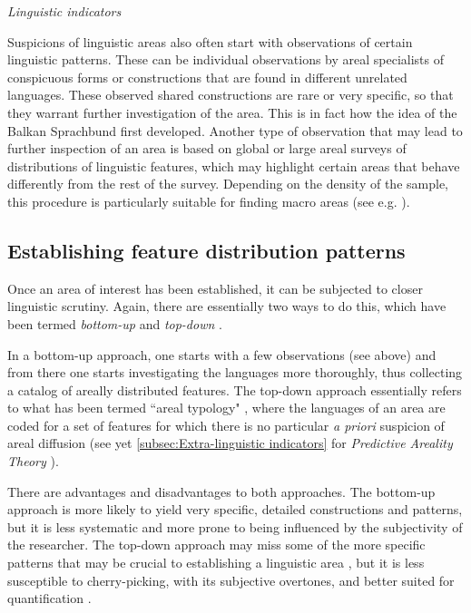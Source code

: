 \documentclass[output=paper,
modfonts
]{langscibook}
\begin{document}
\noindent \textit{Linguistic indicators}

\noindent Suspicions of linguistic areas also often start with observations of certain linguistic patterns. These can be individual observations by areal specialists of conspicuous forms or constructions that are found in different unrelated languages. These observed shared constructions are rare or very specific, so that they warrant further investigation of the area. This is in fact how the idea of the Balkan Sprachbund first developed. Another type of observation that may lead to further inspection of an area is based on global or large areal surveys of distributions of linguistic features, which may highlight certain areas that behave differently from the rest of the survey. Depending on the density of the sample, this procedure is particularly suitable for finding macro areas (see e.g. \citet{Nichols1992Linguistic}). 


\subsection{Establishing feature distribution patterns}

Once an area of interest has been established, it can be subjected to closer linguistic scrutiny. Again, there are essentially two ways to do this, which have been termed \textit{bottom-up} and \textit{top-down} \parencite{muysken2008conceptual}.

In a bottom-up approach, one starts with a few observations (see above) and from there one starts investigating the languages more thoroughly, thus collecting a catalog of areally distributed features. The top-down approach essentially refers to what has been termed ``areal typology" \parencite{Dahl2001Principles}, where the languages of an area are coded for a set of features for which there is no particular \textit{a priori} suspicion of areal diffusion (see yet \ref{subsec:Extra-linguistic indicators} for \textit{Predictive Areality Theory} ).

There are advantages and disadvantages to both approaches. The bottom-up approach is more likely to yield very specific, detailed constructions and patterns, but it is less systematic and more prone to being influenced by the subjectivity of the researcher. The top-down approach may miss some of the more specific patterns that may be crucial to establishing a linguistic area \parencite[see, e.g., ][279--278]{friedman11}, but it is less susceptible to cherry-picking, with its subjective overtones, and better suited for quantification \parencite[see][]{Muyskenetal2014Linguistic}. 
\end{document}
